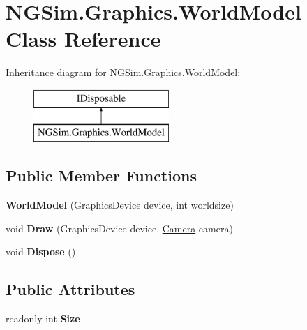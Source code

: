 \hypertarget{class_n_g_sim_1_1_graphics_1_1_world_model}{}\section{N\+G\+Sim.\+Graphics.\+World\+Model Class Reference}
\label{class_n_g_sim_1_1_graphics_1_1_world_model}
Inheritance diagram for N\+G\+Sim.\+Graphics.\+World\+Model\+:\begin{figure}[H]
\begin{center}
\leavevmode
\includegraphics[height=2.000000cm]{class_n_g_sim_1_1_graphics_1_1_world_model}
\end{center}
\end{figure}
\subsection*{Public Member Functions}
\begin{DoxyCompactItemize}
\item 
\mbox{\label{class_n_g_sim_1_1_graphics_1_1_world_model_a5460b8eb04a95667eee5d33735097739}} 
{\bfseries World\+Model} (Graphics\+Device device, int worldsize)
\item 
\mbox{\label{class_n_g_sim_1_1_graphics_1_1_world_model_a3b9ee996637befd6233a547339978402}} 
void {\bfseries Draw} (Graphics\+Device device, \hyperlink{class_n_g_sim_1_1_graphics_1_1_camera}{Camera} camera)
\item 
\mbox{\label{class_n_g_sim_1_1_graphics_1_1_world_model_a8bba041465a2dcb1511a94e355b74ba7}} 
void {\bfseries Dispose} ()
\end{DoxyCompactItemize}
\subsection*{Public Attributes}
\begin{DoxyCompactItemize}
\item 
\mbox{\label{class_n_g_sim_1_1_graphics_1_1_world_model_a84a672fb4e20f3efd59118a6096e399b}} 
readonly int {\bfseries Size}
\end{DoxyCompactItemize}
